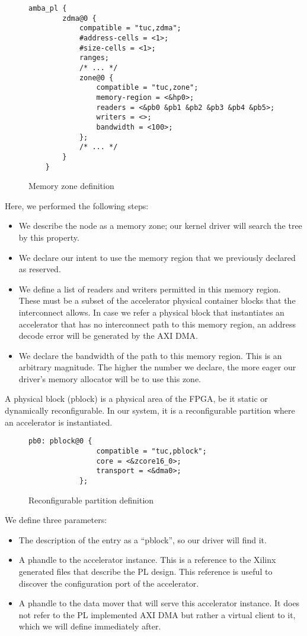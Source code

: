\begin{figure}[ht!]
\centering
\begin{lstlisting}[style=basic]
	amba_pl {
		zdma@0 {
			compatible = "tuc,zdma";
			#address-cells = <1>;
			#size-cells = <1>;
			ranges;
			/* ... */
			zone@0 {
				compatible = "tuc,zone";
				memory-region = <&hp0>;
				readers = <&pb0 &pb1 &pb2 &pb3 &pb4 &pb5>;
				writers = <>;
				bandwidth = <100>;
			};
			/* ... */
		}
	}
\end{lstlisting}
\caption{Memory zone definition}
\label{lst:memzone}
\end{figure}

Here, we performed the following steps:

\begin{itemize}
\item	We describe the node as a memory zone; our kernel driver will search the tree by this property.
\item	We declare our intent to use the memory region that we previously declared as reserved.
\item	We define a list of readers and writers permitted in this memory region. 
	These must be a subset of the accelerator physical container blocks that the interconnect allows.
	In case we refer a physical block that instantiates an accelerator that has no interconnect
	path to this memory region, an address decode error will be generated by the AXI DMA.
\item	We declare the bandwidth of the path to this memory region. 
	This is an arbitrary magnitude. The higher the number we declare, 
	the more eager our driver's memory allocator will be to use this zone.
\end{itemize}

A physical block (pblock) is a physical area of the FPGA, be it static or dynamically reconfigurable.
In our system, it is a reconfigurable partition where an accelerator is instantiated.

\begin{figure}[ht!]
\centering
\begin{lstlisting}[style=basic]
		pb0: pblock@0 {
				compatible = "tuc,pblock";
				core = <&zcore16_0>;
				transport = <&dma0>;
			};
\end{lstlisting}
\caption{Reconfigurable partition definition}
\label{lst:pblock}
\end{figure}

We define three parameters:
\begin{itemize}
\item	The description of the entry as a ``pblock'', so our driver will find it.
\item	A phandle to the accelerator instance.  This is a reference to the Xilinx generated files
	that describe the PL design. This reference is useful to discover the configuration port
	of the accelerator.
\item	A phandle to the data mover that will serve this accelerator instance. It does not refer
	to the PL implemented AXI DMA but rather a virtual client to it, 
	which we will define immediately after.
\end{itemize}

